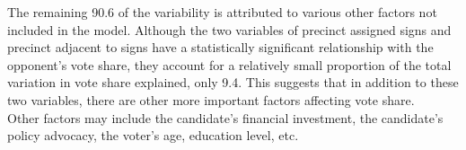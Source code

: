 \documentclass[12pt,letterpaper]{article}
\begin{document}
\begin{enumerate}
The remaining 90.6 of the variability is attributed to various other factors not included in the model. Although the two variables of precinct assigned signs and precinct adjacent to signs have a statistically significant relationship with the opponent's vote share, they account for a relatively small proportion of the total variation in vote share explained, only 9.4. This suggests that in addition to these two variables, there are other more important factors affecting vote share.\\

Other factors may include the candidate's financial investment, the candidate's policy advocacy, the voter's age, education level, etc.
\end{enumerate}  
\end{document}

